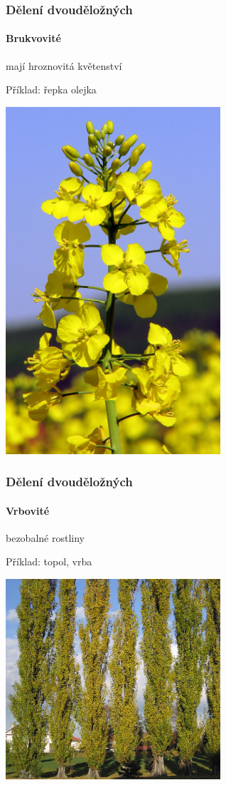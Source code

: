 \documentclass{beamer}
\begin{document}
\begin{frame}
\frametitle{Dělení dvouděložných}
	\framesubtitle{Brukvovité}mají hroznovitá květenství

Příklad: řepka olejka

\begin{center}\includegraphics[width=8cm]{1200px-Brassica_napus_2.jpg}\end{center}
\end{frame}
\begin{frame}
\frametitle{Dělení dvouděložných}
	\framesubtitle{Vrbovité}bezobalné rostliny

Příklad: topol, vrba

\begin{center}\includegraphics[width=8cm]{topol.jpg}\end{center}
\end{frame}
\end{document}
